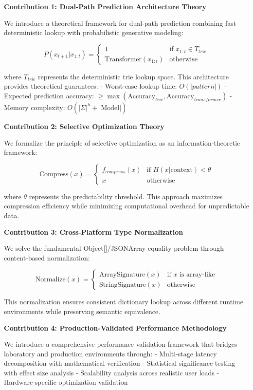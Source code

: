 \documentclass[12pt,a4paper]{article}
\begin{document}
\textbf{Contribution 1: Dual-Path Prediction Architecture Theory}

We introduce a theoretical framework for dual-path prediction combining fast deterministic lookup with probabilistic generative modeling:

$$P(x_{t+1}|x_{1:t}) = \begin{cases}
1 & \text{if } x_{1:t} \in T_{trie} \\
\text{Transformer}(x_{1:t}) & \text{otherwise}
\end{cases}$$

where $T_{trie}$ represents the deterministic trie lookup space. This architecture provides theoretical guarantees:
- Worst-case lookup time: $O(|pattern|)$
- Expected prediction accuracy: $\geq \max(\text{Accuracy}_{trie}, \text{Accuracy}_{transformer})$
- Memory complexity: $O(|\Sigma|^h + |\text{Model}|)$

\textbf{Contribution 2: Selective Optimization Theory}

We formalize the principle of selective optimization as an information-theoretic framework:

$$\text{Compress}(x) = \begin{cases}
f_{compress}(x) & \text{if } H(x|\text{context}) < \theta \\
x & \text{otherwise}
\end{cases}$$

where $\theta$ represents the predictability threshold. This approach maximizes compression efficiency while minimizing computational overhead for unpredictable data.

\textbf{Contribution 3: Cross-Platform Type Normalization}

We solve the fundamental Object[]/JSONArray equality problem through content-based normalization:

$$\text{Normalize}(x) = \begin{cases}
\text{ArraySignature}(x) & \text{if } x \text{ is array-like} \\
\text{StringSignature}(x) & \text{otherwise}
\end{cases}$$

This normalization ensures consistent dictionary lookup across different runtime environments while preserving semantic equivalence.

\textbf{Contribution 4: Production-Validated Performance Methodology}

We introduce a comprehensive performance validation framework that bridges laboratory and production environments through:
- Multi-stage latency decomposition with mathematical verification
- Statistical significance testing with effect size analysis  
- Scalability analysis across realistic user loads
- Hardware-specific optimization validation
\end{document}
